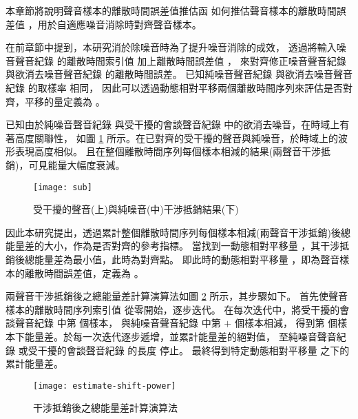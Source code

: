     本章節將說明聲音樣本的離散時間誤差值推估函 \DEFfuncEstm{}
如何推估聲音樣本的離散時間誤差值 \DEFshift，用於自適應噪音消除時對齊聲音樣本。

    在前章節中提到，本研究消於除噪音時為了提升噪音消除的成效，
透過將輸入噪音聲音紀錄 \DEFrecN 的離散時間索引值 \DEFpause 加上離散時間誤差值 \DEFshift，
來對齊修正噪音聲音紀錄 \DEFrecN 與欲消去噪音聲音紀錄 \DEFrecJ 的離散時間誤差。
已知純噪音聲音紀錄 \DEFrecN 與欲消去噪音聲音紀錄 \DEFrecJ 的取樣率 \DEFsamplerate 相同，
因此可以透過動態相對平移兩個離散時間序列來評估是否對齊，平移的量定義為 \DEFcandiSFT。

    已知由於純噪音聲音紀錄 \DEFrecN 與受干擾的會談聲音紀錄 \DEFrecJ 中的欲消去噪音，在時域上有著高度關聯性，
如圖 \ref{fig:estimate-sub} 所示。在已對齊的受干擾的聲音與純噪音，於時域上的波形表現高度相似。
且在整個離散時間序列每個樣本相減的結果(兩聲音干涉抵銷)，可見能量大幅度衰減。

\begin{figure}[H]
    \centering
    \texttt{[image: sub]}
    \caption{受干擾的聲音(上)與純噪音(中)干涉抵銷結果(下)}\label{fig:estimate-sub}
\end{figure}

    因此本研究提出，透過累計整個離散時間序列每個樣本相減(兩聲音干涉抵銷)後總能量差的大小，作為是否對齊的參考指標。
當找到一動態相對平移量 \DEFcandiSFT ，其干涉抵銷後總能量差為最小值，此時為對齊點。
即此時的動態相對平移量 \DEFcandiSFT，即為聲音樣本的離散時間誤差值，定義為 \DEFshift。

    兩聲音干涉抵銷後之總能量差計算演算法如圖 \ref{fig:estimate-power} 所示，其步驟如下。
首先使聲音樣本的離散時間序列索引值 \DEFpause 從零開始，逐步迭代。
在每次迭代中，將受干擾的會談聲音紀錄 \DEFrecJ 中第 \DEFpause  個樣本，
與純噪音聲音紀錄 \DEFrecN 中第 \DEFpause $+$ \DEFcandiSFT 個樣本相減，
得到第 \DEFpause 個樣本下能量差。\DEFpause 於每一次迭代逐步遞增，並累計能量差的絕對值，
至純噪音聲音紀錄 \DEFrecN 或受干擾的會談聲音紀錄 \DEFrecJ 的長度 \DEFtimeLen 停止。
最終得到特定動態相對平移量 \DEFcandiSFT 之下的累計能量差。

\begin{figure}[H]
    \centering
    \texttt{[image: estimate-shift-power]}
    \caption{干涉抵銷後之總能量差計算演算法}\label{fig:estimate-power}
\end{figure}

